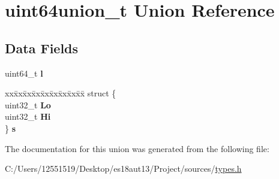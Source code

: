 \hypertarget{unionuint64union__t}{}\section{uint64union\+\_\+t Union Reference}
\label{unionuint64union__t}
\subsection*{Data Fields}
\begin{DoxyCompactItemize}
\item 
\hypertarget{unionuint64union__t_a2d5e8db071e91dd1ed90c03584facdfd}{}uint64\+\_\+t {\bfseries l}\label{unionuint64union__t_a2d5e8db071e91dd1ed90c03584facdfd}

\item 
\hypertarget{unionuint64union__t_a7a3d9c3acdab6ba7e2036681c0202d2e}{}\begin{tabbing}
xx\=xx\=xx\=xx\=xx\=xx\=xx\=xx\=xx\=\kill
struct \{\\
\>uint32\_t {\bfseries Lo}\\
\>uint32\_t {\bfseries Hi}\\
\} {\bfseries s}\label{unionuint64union__t_a7a3d9c3acdab6ba7e2036681c0202d2e}
\\

\end{tabbing}\end{DoxyCompactItemize}


The documentation for this union was generated from the following file\+:\begin{DoxyCompactItemize}
\item 
C\+:/\+Users/12551519/\+Desktop/es18aut13/\+Project/sources/\hyperlink{types_8h}{types.\+h}\end{DoxyCompactItemize}
